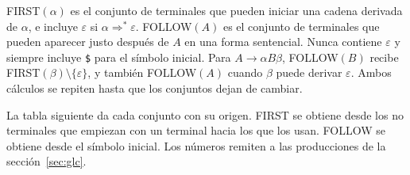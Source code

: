 \documentclass[11pt,a4paper]{article}
\newcommand{\tk}[1]{\texttt{#1}}
\begin{document}
FIRST$(\alpha)$ es el conjunto de terminales que pueden iniciar una
cadena derivada de $\alpha$, e incluye $\varepsilon$ si $\alpha
\Rightarrow^{*} \varepsilon$. FOLLOW$(A)$ es el conjunto de
terminales que pueden aparecer justo después de $A$ en una forma
sentencial. Nunca contiene $\varepsilon$ y siempre incluye \tk{\$}
para el símbolo inicial. Para $A \to \alpha B \beta$, FOLLOW$(B)$
recibe FIRST$(\beta) \setminus \{\varepsilon\}$, y también
FOLLOW$(A)$ cuando $\beta$ puede derivar $\varepsilon$. Ambos
cálculos se repiten hasta que los conjuntos dejan de cambiar.

La tabla siguiente da cada conjunto con su origen. FIRST se obtiene
desde los no terminales que empiezan con un terminal hacia los que
los usan. FOLLOW se obtiene desde el símbolo inicial. Los números
remiten a las producciones de la sección~\ref{sec:glc}.
\end{document}
